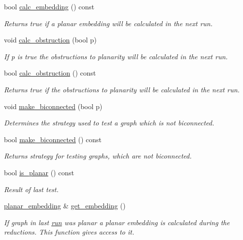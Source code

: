 \begin{DoxyCompactItemize}
bool \mbox{\hyperlink{classplanarity_aea94b0de2deb46ef774179dd3572bf2d}{calc\+\_\+embedding}} () const
\begin{DoxyCompactList}\small\item\em Returns true if a planar embedding will be calculated in the next run. \end{DoxyCompactList}\item 
void \mbox{\hyperlink{classplanarity_a7b8e8e5414a4eedb0f99253d3b62ffa3}{calc\+\_\+obstruction}} (bool p)
\begin{DoxyCompactList}\small\item\em If {\ttfamily p} is true the obstructions to planarity will be calculated in the next run. \end{DoxyCompactList}\item 
bool \mbox{\hyperlink{classplanarity_a0c520ff8f91336a2dc644f9e4ed8bb2e}{calc\+\_\+obstruction}} () const
\begin{DoxyCompactList}\small\item\em Returns true if the obstructions to planarity will be calculated in the next run. \end{DoxyCompactList}\item 
void \mbox{\hyperlink{classplanarity_af67236533dce559d2670eae581750f54}{make\+\_\+biconnected}} (bool p)
\begin{DoxyCompactList}\small\item\em Determines the strategy used to test a graph which is not biconnected. \end{DoxyCompactList}\item 
bool \mbox{\hyperlink{classplanarity_a822d67100814e1887494e7213e6f0531}{make\+\_\+biconnected}} () const
\begin{DoxyCompactList}\small\item\em Returns strategy for testing graphs, which are not biconnected. \end{DoxyCompactList}\item 
bool \mbox{\hyperlink{classplanarity_af60c3d06cffa7ce3a470797fd758be5f}{is\+\_\+planar}} () const
\begin{DoxyCompactList}\small\item\em Result of last test. \end{DoxyCompactList}\item 
\mbox{\hyperlink{classplanar__embedding}{planar\+\_\+embedding}} \& \mbox{\hyperlink{classplanarity_a9ab79a340e361c3300cc08e82edd4e12}{get\+\_\+embedding}} ()
\begin{DoxyCompactList}\small\item\em If graph in last \mbox{\hyperlink{classplanarity_a93232e765c08dd2a4c00d192bb48b5fc}{run}} was planar a planar embedding is calculated during the reductions. This function gives access to it. \end{DoxyCompactList}\item 

\end{DoxyCompactItemize}
